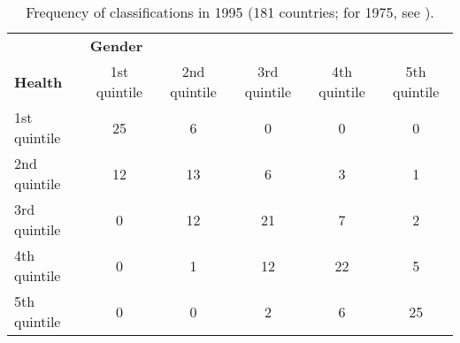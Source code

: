 \begin{table}
\centering
\caption{Frequency of classifications in 1995 (181 countries; for 1975, see ).}
\label{class1995n}
\begin{tabular}{lccccc}
\toprule
                & \multicolumn{5}{l}{\textbf{Gender}} \\
\textbf{Health} & 1st quintile & 2nd quintile & 3rd quintile & 4th quintile & 5th quintile \\
\midrule
1st quintile    & 25           & 6            & 0            & 0            & 0 \\
2nd quintile    & 12           & 13           & 6            & 3            & 1 \\
3rd quintile    & 0            & 12           & 21           & 7            & 2 \\
4th quintile    & 0            & 1            & 12           & 22           & 5 \\
5th quintile    & 0            & 0            & 2            & 6            & 25 \\
\bottomrule
\end{tabular}
\end{table}
